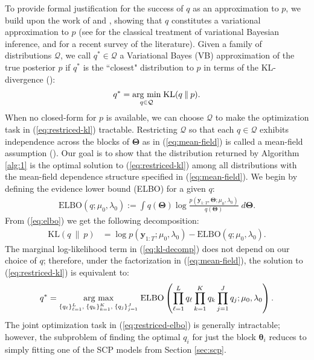 To provide formal justification for the success of $q$ as an approximation to $p$, we build upon the work of \cite{Wang20} and \cite{Cappello22}, showing that $q$ constitutes a variational approximation to $p$ (see \cite{Jordan99} for the classical treatment of variational Bayesian inference, and \cite{Blei17} for a recent survey of the literature). Given a family of distributions $\mathcal{Q}$, we call $q^* \in \mathcal{Q}$ a Variational Bayes (VB) approximation of the true posterior $p$ if $q^*$ is the ``closest" distribution to $p$ in terms of the KL-divergence (\citealp{Kullback51}):
\begin{align} \label{eq:restriced-kl}
    q^* = \underset{q \in \mathcal{Q}}{\text{\normalfont arg min}}  \; \text{KL}( q \:\lVert\: p).
\end{align}
When no closed-form for $p$ is available, we can choose $\mathcal{Q}$ to make the optimization task in (\ref{eq:restriced-kl}) tractable. Restricting $\mathcal{Q}$ so that each $q \in \mathcal{Q}$ exhibits independence across the blocks of $\boldsymbol{\Theta}$ as in (\ref{eq:mean-field}) is called a mean-field assumption (\citealp{Wainwright08}). Our goal is to show that the distribution returned by Algorithm \ref{alg:1} is the optimal solution to (\ref{eq:restriced-kl}) among all distributions with the mean-field dependence structure specified in (\ref{eq:mean-field}). We begin by defining the evidence lower bound (ELBO) for a given $q$:
\begin{align}\label{eq:elbo}
    \text{ELBO}(q;\mu_0,\lambda_0) := \int q(\boldsymbol{\Theta}) \log \frac{ p(\mathbf{y}_{1:T},\boldsymbol{\Theta};\mu_0,\lambda_0)}{q(\boldsymbol{\Theta})} \; d\boldsymbol{\Theta}.
\end{align}
From (\ref{eq:elbo}) we get the following decomposition:
\begin{align}\label{eq:kl-decomp} 
     \text{KL}( q \:\lVert\: p) &= \log p(\mathbf{y}_{1:T};\mu_0,\lambda_0) - \text{ELBO}(q;\mu_0,\lambda_0). 
\end{align}
The marginal log-likelihood term in (\ref{eq:kl-decomp}) does not depend on our choice of $q$; therefore, under the factorization in (\ref{eq:mean-field}), the solution to (\ref{eq:restriced-kl}) is equivalent to:
\begin{align} \label{eq:restriced-elbo}
    q^* = \underset{\{q_\ell\}_{\ell=1}^L,\; \{q_k\}_{k=1}^K,\; \{q_j\}_{j=1}^J}{\text{\normalfont arg max}}  \; \text{ELBO}\left(\prod_{\ell=1}^L q_\ell \prod_{k=1}^K q_k \prod_{j=1}^J q_j;\mu_0,\lambda_0\right).
\end{align}
The joint optimization task in (\ref{eq:restriced-elbo}) is generally intractable; however, the subproblem of finding the optimal $q_i$ for just the block $\boldsymbol{\theta}_i$ reduces to simply fitting one of the SCP models from Section \ref{sec:scp}.

